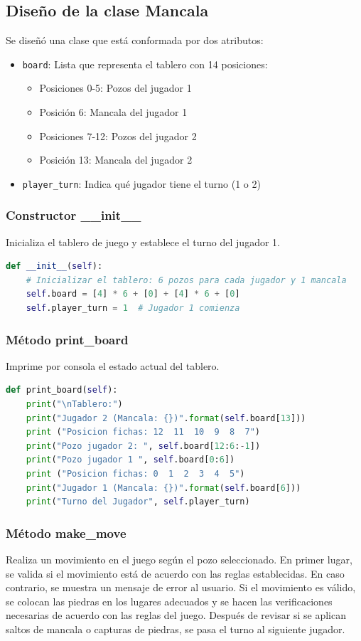 \documentclass[12pt]{article}
\begin{document}
\subsection{Diseño de la clase \textbf{Mancala}}
Se diseñó una clase que está conformada por dos atributos:
\begin{itemize}
    \item \texttt{board}: Lista que representa el tablero con 14 posiciones:
    \begin{itemize}
        \item Posiciones 0-5: Pozos del jugador 1
        \item Posición 6: Mancala del jugador 1
        \item Posiciones 7-12: Pozos del jugador 2
        \item Posición 13: Mancala del jugador 2
    \end{itemize}
    \item \texttt{player\_turn}: Indica qué jugador tiene el turno (1 o 2)
\end{itemize}

\subsubsection{Constructor \_\_init\_\_}
Inicializa el tablero de juego y establece el turno del jugador 1.
\begin{lstlisting}[language=Python]
def __init__(self):
    # Inicializar el tablero: 6 pozos para cada jugador y 1 mancala
    self.board = [4] * 6 + [0] + [4] * 6 + [0]
    self.player_turn = 1  # Jugador 1 comienza
\end{lstlisting}
\subsubsection{Método print\_board}
Imprime por consola el estado actual del tablero.
\begin{lstlisting}[language=Python]
def print_board(self):
    print("\nTablero:")
    print("Jugador 2 (Mancala: {})".format(self.board[13]))
    print ("Posicion fichas: 12  11  10  9  8  7")
    print("Pozo jugador 2: ", self.board[12:6:-1])
    print("Pozo jugador 1 ", self.board[0:6])
    print ("Posicion fichas: 0  1  2  3  4  5")
    print("Jugador 1 (Mancala: {})".format(self.board[6]))
    print("Turno del Jugador", self.player_turn)
\end{lstlisting}

\subsubsection{Método make\_move}
Realiza un movimiento en el juego según el pozo seleccionado. En primer lugar, se valida si el movimiento está de acuerdo con las reglas establecidas. En caso contrario, se muestra un mensaje de error al usuario. Si el movimiento es válido, se colocan las piedras en los lugares adecuados y se hacen las verificaciones necesarias de acuerdo con las reglas del juego. Después de revisar si se aplican saltos de mancala o capturas de piedras, se pasa el turno al siguiente jugador.
\end{document}
